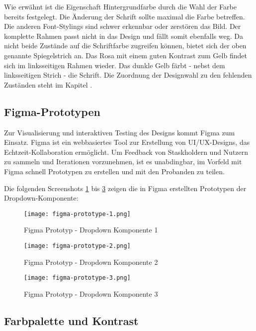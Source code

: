 Wie erwähnt ist die Eigenschaft Hintergrundfarbe durch die Wahl der Farbe bereits festgelegt. 
Die Änderung der Schrift sollte maximal die Farbe betreffen. 
Die anderen Font-Stylings sind schwer erkennbar oder zerstören das Bild.
Der komplette Rahmen passt nicht in das Design und fällt somit ebenfalls weg.
Da nicht beide Zustände auf die Schriftfarbe zugreifen können, bietet sich der oben genannte Spiegelstrich an.
Das Rosa mit einem guten Kontrast zum Gelb findet sich im linksseitigen Rahmen wieder.
Das dunkle Gelb färbt - nebst dem linksseitigen Strich - die Schrift.
Die Zuordnung der Designwahl zu den fehlenden Zuständen steht im Kapitel \textbf{}.


\clearpage
\subsection{Figma-Prototypen}
\label{sec:figmaPrototype}

Zur Visualisierung und interaktiven Testing des Designs kommt Figma zum Einsatz. 
Figma ist ein webbasiertes Tool zur Erstellung von UI/UX-Designs, das Echtzeit-Kollaboration ermöglicht. 
Um Feedback von Staskholdern und Nutzern zu sammeln und Iterationen vorzunehmen, ist es unabdingbar, im Vorfeld mit Figma schnell Prototypen zu erstellen und mit den Probanden zu teilen.

Die folgenden Screenshots \ref{img:figmaPrototype1} bis \ref{img:figmaPrototype3} zeigen die in Figma erstellten Prototypen der Dropdown-Komponente:

\begin{figure}[!htb]
    \centering
    \texttt{[image: figma-prototype-1.png]}
    \caption{Figma Prototyp - Dropdown Komponente 1}
    \label{img:figmaPrototype1}
\end{figure}

\begin{figure}[!htb]
    \centering
    \texttt{[image: figma-prototype-2.png]}
    \caption{Figma Prototyp - Dropdown Komponente 2}
    \label{img:figmaPrototype2}
\end{figure}

\begin{figure}[!htb]
    \centering
    \texttt{[image: figma-prototype-3.png]}
    \caption{Figma Prototyp - Dropdown Komponente 3}
    \label{img:figmaPrototype3}
\end{figure}


\subsection{Farbpalette und Kontrast}
\label{sec:colorContrast}

